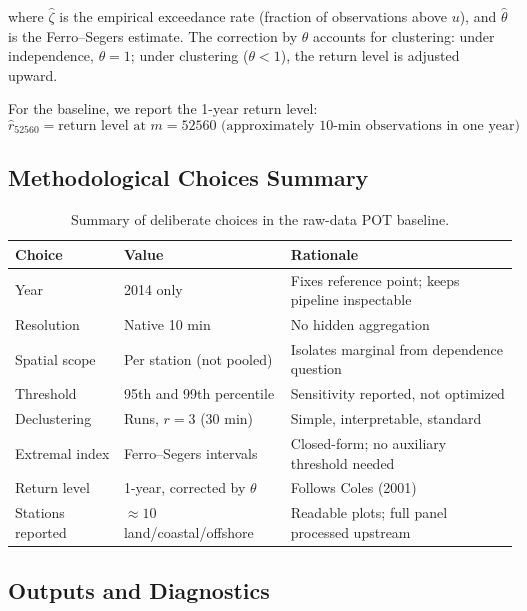 where $\hat{\zeta}$ is the empirical exceedance rate (fraction of observations above $u$), and $\hat{\theta}$ is the Ferro--Segers estimate. The correction by $\theta$ accounts for clustering: under independence, $\theta = 1$; under clustering ($\theta < 1$), the return level is adjusted upward.

For the baseline, we report the 1-year return level:
\[
\hat{r}_{52560} = \text{return level at } m = 52560 \text{ (approximately 10-min observations in one year)}
\]

\subsection{Methodological Choices Summary}

\begin{table}[h]
\centering
\caption{Summary of deliberate choices in the raw-data POT baseline.}
\label{tab:pot_choices}
\begin{tabular}{lll}
\toprule
\textbf{Choice} & \textbf{Value} & \textbf{Rationale} \\
\midrule
Year & 2014 only & Fixes reference point; keeps pipeline inspectable \\
Resolution & Native 10 min & No hidden aggregation \\
Spatial scope & Per station (not pooled) & Isolates marginal from dependence question \\
Threshold & 95th and 99th percentile & Sensitivity reported, not optimized \\
Declustering & Runs, $r = 3$ (30 min) & Simple, interpretable, standard \\
Extremal index & Ferro--Segers intervals & Closed-form; no auxiliary threshold needed \\
Return level & 1-year, corrected by $\theta$ & Follows Coles (2001) \\
Stations reported & $\approx 10$ land/coastal/offshore & Readable plots; full panel processed upstream \\
\bottomrule
\end{tabular}
\end{table}

\subsection{Outputs and Diagnostics}

